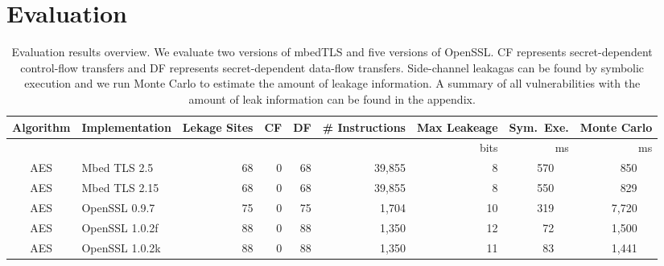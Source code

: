 \section{Evaluation}
\label{res_overview}

\begin{table}
    \centering
    \caption{Evaluation results overview. We evaluate two versions of mbedTLS and five
        versions of OpenSSL\@. CF represents secret-dependent control-flow transfers and
        DF represents secret-dependent data-flow transfers. Side-channel leakagas can
        be found by symbolic execution and we run Monte Carlo to estimate the amount
        of leakage information. A summary of all vulnerabilities with the amount of
        leak information can be found in the appendix.
    }\label{fig:Testtt}
\newlength{\x}
\newlength{\y}
\settowidth{\x}{~~}
\settowidth{\y}{m}
\addtolength{\x}{-1\y}
\newcommand{\foo}{\mbox{\hspace*{\the\x}}}
    \begin{tabular}{clrrrrrrr}
        \hline
        \textbf{Algorithm} & \textbf{Implementation}  & \textbf{Lekage Sites} & \textbf{CF}         & \textbf{DF}
                           & \textbf{\# Instructions} & \textbf{Max Leakeage} & \textbf{Sym.\ Exe.} & \textbf{Monte Carlo}                                                     \\\hline
                           &                          &                       &                     &                      &             & bits & ms         & ms              \\\cline{7-9}
        AES                & Mbed TLS 2.5             & 68                    & 0                   & 68                   & 39,855      & 8    & 570 ~~     & 850 ~~          \\
        AES                & Mbed TLS 2.15            & 68                    & 0                   & 68                   & 39,855      & 8    & 550 ~~     & 829 ~~          \\
        AES                & OpenSSL 0.9.7            & 75                    & 0                   & 75                   & 1,704       & 10   & 319 ~~     & 7,720 ~~        \\
        AES                & OpenSSL 1.0.2f           & 88                    & 0                   & 88                   & 1,350       & 12   & 72 ~~      & 1,500 ~~        \\
        AES                & OpenSSL 1.0.2k           & 88                    & 0                   & 88                   & 1,350       & 11   & 83 ~~      & 1,441 ~~        \\

\end{tabular}
\end{table}

